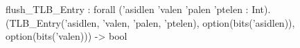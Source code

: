 flush_TLB_Entry : forall ('asidlen 'valen 'palen 'ptelen : Int).
  (TLB_Entry('asidlen, 'valen, 'palen, 'ptelen), option(bits('asidlen)), option(bits('valen))) -> bool